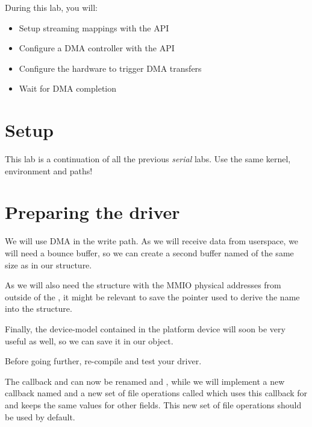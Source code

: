 
During this lab, you will:

\begin{itemize}
\item Setup streaming mappings with the  API
\item Configure a DMA controller with the  API
\item Configure the hardware to trigger DMA transfers
\item Wait for DMA completion
\end{itemize}

\section{Setup}

This lab is a continuation of all the previous {\em serial} labs. Use
the same kernel, environment and paths!

\section{Preparing the driver}

We will use DMA in the write path. As we will receive data from
userspace, we will need a bounce buffer, so we can create a second
buffer named  of the same size as  in our
 structure.

As we will also need the  structure with the MMIO physical
addresses from outside of the , it might be relevant to save
the  pointer used to derive the  name into the
 structure.

Finally, the device-model  contained in the
platform device will soon be very useful as well, so we can save it in
our  object.

Before going further, re-compile and test your driver.

The  callback and  can now be renamed  and ,
while we will implement a new callback named  and a new
set of file operations called  which uses this callback
for  and keeps the same values for other fields. This new set of
file operations should be used by default.


